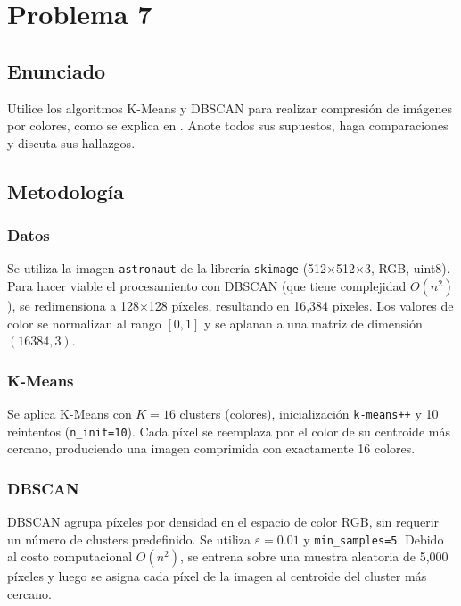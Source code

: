 \documentclass{article}
\begin{document}
\section{Problema 7}

\subsection{Enunciado}

Utilice los algoritmos K-Means y DBSCAN para realizar compresión de imágenes por colores, como se explica en \cite{imageCompressionKMeans}. Anote todos sus supuestos, haga comparaciones y discuta sus hallazgos.

\subsection{Metodología}

\subsubsection{Datos}

Se utiliza la imagen \texttt{astronaut} de la librería \texttt{skimage} (512$\times$512$\times$3, RGB, uint8). Para hacer viable el procesamiento con DBSCAN (que tiene complejidad $O(n^2)$), se redimensiona a 128$\times$128 píxeles, resultando en 16,384 píxeles. Los valores de color se normalizan al rango $[0, 1]$ y se aplanan a una matriz de dimensión $(16384, 3)$.

\subsubsection{K-Means}

Se aplica K-Means con $K = 16$ clusters (colores), inicialización \texttt{k-means++} y 10 reintentos (\texttt{n\_init=10}). Cada píxel se reemplaza por el color de su centroide más cercano, produciendo una imagen comprimida con exactamente 16 colores.

\subsubsection{DBSCAN}

DBSCAN agrupa píxeles por densidad en el espacio de color RGB, sin requerir un número de clusters predefinido. Se utiliza $\varepsilon = 0.01$ y \texttt{min\_samples=5}. Debido al costo computacional $O(n^2)$, se entrena sobre una muestra aleatoria de 5,000 píxeles y luego se asigna cada píxel de la imagen al centroide del cluster más cercano.
\end{document}
